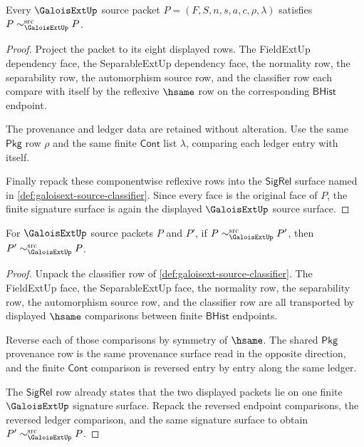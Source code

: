\begin{theorem}
\label{thm:galoisext-source-classifier-reflexive}
Every $\GaloisExtUp$ source packet
$P=(F,S,n,s,a,c,\rho,\lambda)$ satisfies
$P\sim_{\GaloisExtUp}^{\mathrm{src}}P$.
\end{theorem}
\begin{proof}
Project the packet to its eight displayed rows. The FieldExtUp dependency
face, the SeparableExtUp dependency face, the normality row, the separability
row, the automorphism source row, and the classifier row each compare with
itself by the reflexive $\hsame$ row on the corresponding $\mathsf{BHist}$
endpoint.

The provenance and ledger data are retained without alteration. Use the same
$\mathsf{Pkg}$ row $\rho$ and the same finite $\mathsf{Cont}$ list
$\lambda$, comparing each ledger entry with itself.

Finally repack these componentwise reflexive rows into the $\mathsf{SigRel}$
surface named in \autoref{def:galoisext-source-classifier}. Since every face
is the original face of $P$, the finite signature surface is again the
displayed $\GaloisExtUp$ source surface.
\end{proof}

\begin{theorem}
\label{thm:galoisext-source-classifier-symmetric}
For $\GaloisExtUp$ source packets $P$ and $P'$, if
$P\sim_{\GaloisExtUp}^{\mathrm{src}}P'$, then
$P'\sim_{\GaloisExtUp}^{\mathrm{src}}P$.
\end{theorem}
\begin{proof}
Unpack the classifier row of \autoref{def:galoisext-source-classifier}. The
FieldExtUp face, the SeparableExtUp face, the normality row, the separability
row, the automorphism source row, and the classifier row are all transported
by displayed $\hsame$ comparisons between finite $\mathsf{BHist}$ endpoints.

Reverse each of those comparisons by symmetry of $\hsame$. The shared
$\mathsf{Pkg}$ provenance row is the same provenance surface read in the
opposite direction, and the finite $\mathsf{Cont}$ comparison is reversed
entry by entry along the same ledger.

The $\mathsf{SigRel}$ row already states that the two displayed packets lie on
one finite $\GaloisExtUp$ signature surface. Repack the reversed endpoint
comparisons, the reversed ledger comparison, and the same signature surface to
obtain $P'\sim_{\GaloisExtUp}^{\mathrm{src}}P$.
\end{proof}

